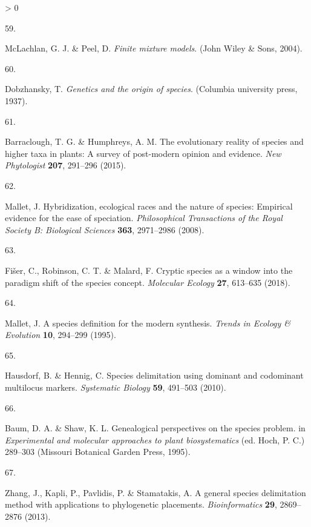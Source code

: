 \documentclass[
  11pt,
]{article}
\newlength{\cslhangindent}
\newlength{\csllabelwidth}
\newenvironment{CSLReferences}[2] %
 {%
  \setlength{\parindent}{0pt}
  \ifodd #1 \everypar{\setlength{\hangindent}{\cslhangindent}}\ignorespaces\fi
  \ifnum #2 > 0
  \setlength{\parskip}{#2\baselineskip}
  \fi
 }%
 {}
\newcommand{\CSLLeftMargin}[1]{\parbox[t]{\csllabelwidth}{#1}}
\newcommand{\CSLRightInline}[1]{\parbox[t]{\linewidth - \csllabelwidth}{#1}\break}
\begin{document}
\begin{CSLReferences}{0}{0}
\leavevmode\hypertarget{ref-mclachlan2004finite}{}%
\CSLLeftMargin{59. }
\CSLRightInline{McLachlan, G. J. \& Peel, D. \emph{Finite mixture models}. (John Wiley \& Sons, 2004).}

\leavevmode\hypertarget{ref-dobzhansky1937genetics}{}%
\CSLLeftMargin{60. }
\CSLRightInline{Dobzhansky, T. \emph{Genetics and the origin of species}. (Columbia university press, 1937).}

\leavevmode\hypertarget{ref-barraclough2015evolutionary}{}%
\CSLLeftMargin{61. }
\CSLRightInline{Barraclough, T. G. \& Humphreys, A. M. The evolutionary reality of species and higher taxa in plants: A survey of post-modern opinion and evidence. \emph{New Phytologist} \textbf{207}, 291--296 (2015).}

\leavevmode\hypertarget{ref-mallet2008hybridization}{}%
\CSLLeftMargin{62. }
\CSLRightInline{Mallet, J. Hybridization, ecological races and the nature of species: Empirical evidence for the ease of speciation. \emph{Philosophical Transactions of the Royal Society B: Biological Sciences} \textbf{363}, 2971--2986 (2008).}

\leavevmode\hypertarget{ref-fivser2018cryptic}{}%
\CSLLeftMargin{63. }
\CSLRightInline{Fišer, C., Robinson, C. T. \& Malard, F. Cryptic species as a window into the paradigm shift of the species concept. \emph{Molecular Ecology} \textbf{27}, 613--635 (2018).}

\leavevmode\hypertarget{ref-mallet1995species}{}%
\CSLLeftMargin{64. }
\CSLRightInline{Mallet, J. A species definition for the modern synthesis. \emph{Trends in Ecology \& Evolution} \textbf{10}, 294--299 (1995).}

\leavevmode\hypertarget{ref-hausdorf2010species}{}%
\CSLLeftMargin{65. }
\CSLRightInline{Hausdorf, B. \& Hennig, C. Species delimitation using dominant and codominant multilocus markers. \emph{Systematic Biology} \textbf{59}, 491--503 (2010).}

\leavevmode\hypertarget{ref-baum1995genealogical}{}%
\CSLLeftMargin{66. }
\CSLRightInline{Baum, D. A. \& Shaw, K. L. {Genealogical perspectives on the species problem}. in \emph{Experimental and molecular approaches to plant biosystematics} (ed. Hoch, P. C.) 289--303 (Missouri Botanical Garden Press, 1995).}

\leavevmode\hypertarget{ref-zhang2013general}{}%
\CSLLeftMargin{67. }
\CSLRightInline{Zhang, J., Kapli, P., Pavlidis, P. \& Stamatakis, A. A general species delimitation method with applications to phylogenetic placements. \emph{Bioinformatics} \textbf{29}, 2869--2876 (2013).}


\end{CSLReferences}
\end{document}
